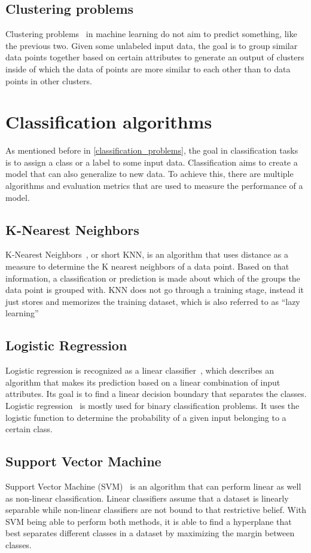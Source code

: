 \subsection{Clustering problems}
Clustering problems~\cite{clustering} in machine learning do not aim to predict something, like the previous two. Given some unlabeled input data, the goal is to group similar data points together based on certain attributes to generate an output of clusters inside of which the data of points are more similar to each other than to data points in other clusters.

\section{Classification algorithms} \label{classification}
As mentioned before in \ref{classification_problems}, the goal in classification tasks~\cite{classification_regression} is to assign a class or a label to some input data. Classification aims to create a model that can also generalize to new data. To achieve this, there are multiple algorithms and evaluation metrics that are used to measure the performance of a model.

\subsection{K-Nearest Neighbors}
K-Nearest Neighbors~\cite{knn}, or short KNN, is an algorithm that uses distance as a measure to determine the K nearest neighbors of a data point. Based on that information, a classification or prediction is made about which of the groups the data point is grouped with. KNN does not go through a training stage, instead it just stores and memorizes the training dataset, which is also referred to as ``lazy learning''

\subsection{Logistic Regression}
Logistic regression is recognized as a linear classifier~\cite{linear_classifier}, which describes an algorithm that makes its prediction based on a linear combination of input attributes. Its goal is to find a linear decision boundary that separates the classes. Logistic regression~\cite{logistic_regression} is mostly used for binary classification problems. It uses the logistic function to determine the probability of a given input belonging to a certain class. 

\subsection{Support Vector Machine}
Support Vector Machine (SVM)~\cite{svm} is an algorithm that can perform linear as well as non-linear classification. Linear classifiers assume that a dataset is linearly separable while non-linear classifiers are not bound to that restrictive belief. With SVM being able to perform both methods, it is able to find a hyperplane that best separates different classes in a dataset by maximizing the margin between classes. 

